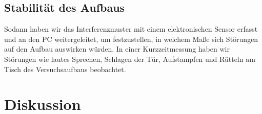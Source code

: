 \documentclass[10pt,a4paper]{article}
\begin{document}
\subsection{Stabilität des Aufbaus}

Sodann haben wir das Interferenzmuster mit einem elektronischen Sensor erfasst und an den PC weitergeleitet, um festzustellen, in welchem Maße sich Störungen auf den Aufbau auswirken würden. In einer Kurzzeitmessung haben wir Störungen wie lautes Sprechen, Schlagen der Tür, Aufstampfen und Rütteln am Tisch des Versuchsaufbaus beobachtet.

\section{Diskussion}


\end{document}
